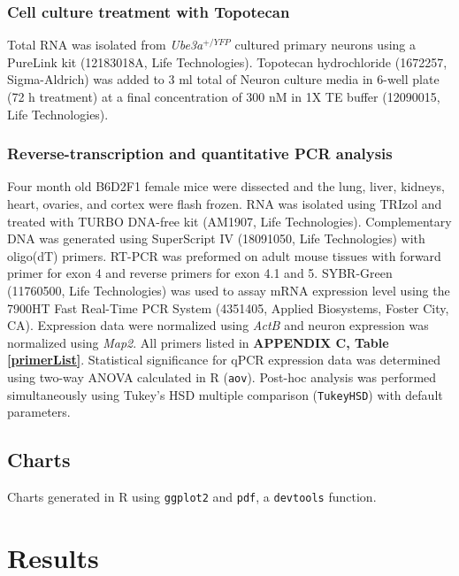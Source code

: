 \subsubsection{Cell culture treatment with Topotecan}
Total RNA was isolated from \textit{Ube3a$^{+/YFP}$} cultured primary neurons using a PureLink kit (12183018A, Life Technologies). Topotecan hydrochloride (1672257, Sigma-Aldrich) was added to 3 ml total of Neuron culture media in 6-well plate (72 h treatment) at a final concentration of 300 nM in 1X TE buffer (12090015, Life Technologies).

\subsubsection{Reverse-transcription and quantitative PCR analysis}
Four month old B6D2F1 female mice were dissected and the lung, liver, kidneys, heart, ovaries, and cortex were flash frozen. RNA was isolated using TRIzol and treated with TURBO DNA-free kit (AM1907, Life Technologies). Complementary DNA was generated using SuperScript IV (18091050, Life Technologies) with oligo(dT) primers. RT-PCR was preformed on adult mouse tissues with forward primer for exon 4 and reverse primers for exon 4.1 and 5. SYBR-Green (11760500, Life Technologies) was used to assay mRNA expression level using the 7900HT Fast Real-Time PCR System (4351405, Applied Biosystems, Foster City, CA). Expression data were normalized using \textit{ActB} and neuron expression was normalized using \textit{Map2}. All primers listed in \textbf{APPENDIX C, Table \ref{primerList}}. Statistical significance for qPCR expression data was determined using two-way ANOVA calculated in R (\texttt{aov}). Post-hoc analysis was performed simultaneously using Tukey's HSD multiple comparison (\texttt{TukeyHSD}) with default parameters.

\subsection{Charts}
Charts generated in R using \texttt{ggplot2} and \texttt{pdf}, a \texttt{devtools} function.

\section{Results}
